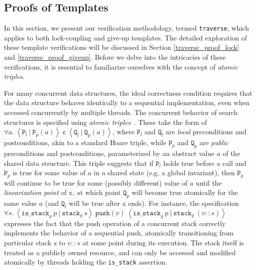 \documentclass[a4paper,UKenglish,cleveref, autoref, thm-restate]{lipics-v2021}
\begin{document}
\subsection{Proofs of Templates} 
In this section, we present our verification methodology, termed \lstinline{traverse}, which applies to both lock-coupling and give-up templates. The detailed exploration of these template verifications will be discussed in Section \ref{traverse_proof_lock} and \ref{traverse_proof_giveup}. Before we delve into the intricacies of these verifications, it is essential to familiarize ourselves with the concept of \emph{atomic triples}.

For many concurrent data structures, the ideal correctness condition requires that the data structure behaves identically to a sequential implementation, even when accessed concurrently by multiple threads. The concurrent behavior of search structures is specified using \emph{atomic triples}~\cite{tada}. These take the form of $\forall a.\ \left\langle \texttt{P}_l\ |\ \texttt{P}_p(a) \right\rangle\ \texttt{c}\ \left\langle \texttt{Q}_l\ |\ \texttt{Q}_p(a)\right\rangle$, where $\texttt{P}_l$ and $\texttt{Q}_l$ are \emph{local} preconditions and postconditions, akin to a standard Hoare triple, while $\texttt{P}_p$ and $\texttt{Q}_p$ are \emph{public} preconditions and postconditions, parameterized by an abstract value $a$ of the shared data structure. This triple suggests that if $\texttt{P}_l$ holds true before a call and $\texttt{P}_p$ is true for some value of $a$ in a shared state (e.g. a global invariant), then $\texttt{P}_p$ will continue to be true for some (possibly different) value of $a$ until the \emph{linearization point} of $\texttt{c}$, at which point $\texttt{Q}_p$ will become true atomically for the same value $a$ (and $\texttt{Q}_l$ will be true after $\texttt{c}$ ends). For instance, the specification
$\forall s.\ \left\langle \texttt{is\_stack}_g\ p\ |\ \texttt{stack}_g\ s\right\rangle\ \texttt{push}(v)\ \left\langle \texttt{is\_stack}_g\ p\ |\ \texttt{stack}_g\ (v::s)\right\rangle$
expresses the fact that the push operation of a concurrent stack correctly implements the behavior of a sequential push, atomically transitioning from particular stack $s$ to $v::s$ at some point during its execution. The stack itself is treated as a publicly owned resource, and can only be accessed and modified atomically by threads holding the \texttt{is\_stack} assertion.
\end{document}
